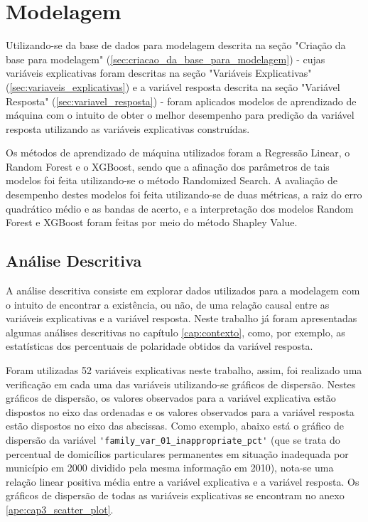 \chapter{Modelagem}
\label{cap:modelagem}

Utilizando-se da base de dados para modelagem descrita na seção "Criação da base para modelagem" (\ref{sec:criacao_da_base_para_modelagem}) - cujas variáveis explicativas foram descritas na seção "Variáveis Explicativas" (\ref{sec:variaveis_explicativas}) e a variável resposta descrita na seção "Variável Resposta" (\ref{sec:variavel_resposta}) - foram aplicados modelos de aprendizado de máquina com o intuito de obter o melhor desempenho para predição da variável resposta utilizando as variáveis explicativas construídas.

Os métodos de aprendizado de máquina utilizados foram a Regressão Linear, o Random Forest e o XGBoost, sendo que a afinação dos parâmetros de tais modelos foi feita utilizando-se o método Randomized Search. A avaliação de desempenho destes modelos foi feita utilizando-se de duas métricas, a raiz do erro quadrático médio e as bandas de acerto, e a interpretação dos modelos Random Forest e XGBoost foram feitas por meio do método Shapley Value.

\section{Análise Descritiva}
\label{sec:analise_descritiva}

A análise descritiva consiste em explorar dados utilizados para a modelagem com o intuito de encontrar a existência, ou não, de uma relação causal entre as variáveis explicativas e a variável resposta. Neste trabalho já foram apresentadas algumas análises descritivas no capítulo \ref{cap:contexto}, como, por exemplo, as estatísticas dos percentuais de polaridade obtidos da variável resposta.

Foram utilizadas 52 variáveis explicativas neste trabalho, assim, foi realizado uma verificação em cada uma das variáveis utilizando-se gráficos de dispersão. Nestes gráficos de dispersão, os valores observados para a variável explicativa estão dispostos no eixo das ordenadas e os valores observados para a variável resposta estão dispostos no eixo das abscissas. Como exemplo, abaixo está o gráfico de dispersão da variável \verb|'family_var_01_inappropriate_pct'| (que se trata do percentual de domicílios particulares permanentes em situação inadequada por município em 2000 dividido pela mesma informação em 2010), nota-se uma relação linear positiva média entre a variável explicativa e a variável resposta. Os gráficos de dispersão de todas as variáveis explicativas se encontram no anexo \ref{ape:cap3_scatter_plot}.

